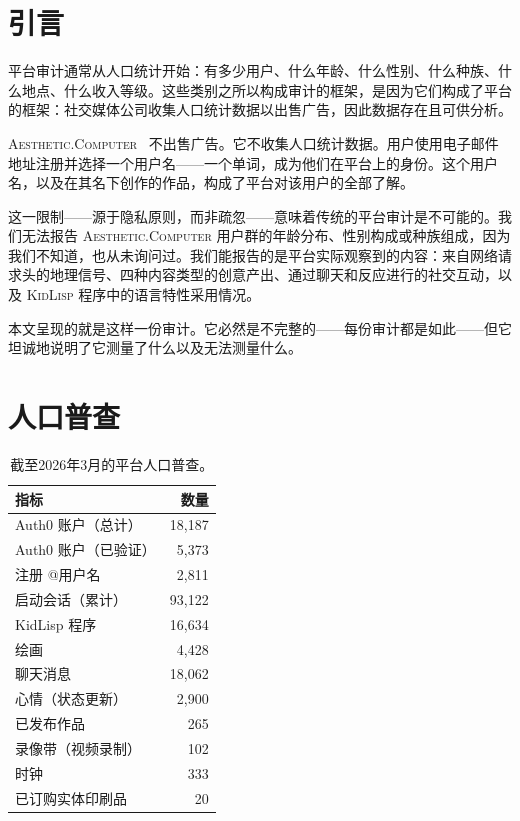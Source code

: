 \documentclass[10pt,letterpaper,twocolumn]{article}
\newcommand{\ac}{\textsc{Aesthetic.Computer}}
\newcommand{\kl}{\textsc{KidLisp}}
\begin{document}
\section{引言}

平台审计通常从人口统计开始：有多少用户、什么年龄、什么性别、什么种族、什么地点、什么收入等级。这些类别之所以构成审计的框架，是因为它们构成了平台的框架：社交媒体公司收集人口统计数据以出售广告，因此数据存在且可供分析。

\ac{}~\citep{scudder2026ac} 不出售广告。它不收集人口统计数据。用户使用电子邮件地址注册并选择一个用户名——一个单词，成为他们在平台上的身份。这个用户名，以及在其名下创作的作品，构成了平台对该用户的全部了解。

这一限制——源于隐私原则，而非疏忽——意味着传统的平台审计是不可能的。我们无法报告 \ac{} 用户群的年龄分布、性别构成或种族组成，因为我们不知道，也从未询问过。我们能报告的是平台实际观察到的内容：来自网络请求头的地理信号、四种内容类型的创意产出、通过聊天和反应进行的社交互动，以及 \kl{} 程序中的语言特性采用情况。

本文呈现的就是这样一份审计。它必然是不完整的——每份审计都是如此——但它坦诚地说明了它测量了什么以及无法测量什么。

\section{人口普查}

\begin{table}[h]
\small
\centering
\begin{tabularx}{\columnwidth}{Xr}
\toprule
\textbf{指标} & \textbf{数量} \\
\midrule
Auth0 账户（总计） & 18,187 \\
Auth0 账户（已验证） & 5,373 \\
注册 @用户名 & 2,811 \\
启动会话（累计） & 93,122 \\
\midrule
KidLisp 程序 & 16,634 \\
绘画 & 4,428 \\
聊天消息 & 18,062 \\
心情（状态更新） & 2,900 \\
已发布作品 & 265 \\
录像带（视频录制） & 102 \\
时钟 & 333 \\
已订购实体印刷品 & 20 \\
\bottomrule
\end{tabularx}
\caption{截至2026年3月的平台人口普查。}
\label{tab:census}
\end{table}
\end{document}
